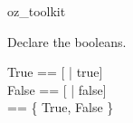 \begin{zsection}
  \SECTION oz\_toolkit
\end{zsection}













Declare the booleans.
\begin{zed}
  True == [ | true]\\
  False == [ | false]\\
  \bool == \{ True, False \}
\end{zed}
